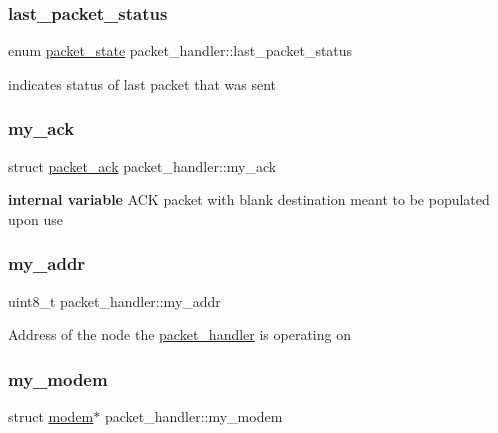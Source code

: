\subsubsection{\texorpdfstring{last\+\_\+packet\+\_\+status}{last\_packet\_status}}
{\footnotesize\ttfamily enum \mbox{\hyperlink{packet__handler_8h_aacdc622aa02a946d7a3d67c361199733}{packet\+\_\+state}} packet\+\_\+handler\+::last\+\_\+packet\+\_\+status}

indicates status of last packet that was sent \mbox{\label{structpacket__handler_a9a9807acb460e1501faeead198c71f2d}} 
\subsubsection{\texorpdfstring{my\+\_\+ack}{my\_ack}}
{\footnotesize\ttfamily struct \mbox{\hyperlink{structpacket__ack}{packet\+\_\+ack}} packet\+\_\+handler\+::my\+\_\+ack}

{\bfseries internal variable} A\+CK packet with blank destination meant to be populated upon use \mbox{\label{structpacket__handler_a4f29d292bd4d2732b7c0b59a1301dcb2}} 
\subsubsection{\texorpdfstring{my\+\_\+addr}{my\_addr}}
{\footnotesize\ttfamily uint8\+\_\+t packet\+\_\+handler\+::my\+\_\+addr}

Address of the node the \mbox{\hyperlink{structpacket__handler}{packet\+\_\+handler}} is operating on \mbox{\label{structpacket__handler_a5e31603aa81c5e3a233e85f09630f443}} 
\subsubsection{\texorpdfstring{my\+\_\+modem}{my\_modem}}
{\footnotesize\ttfamily struct \mbox{\hyperlink{structmodem}{modem}}$\ast$ packet\+\_\+handler\+::my\+\_\+modem}

